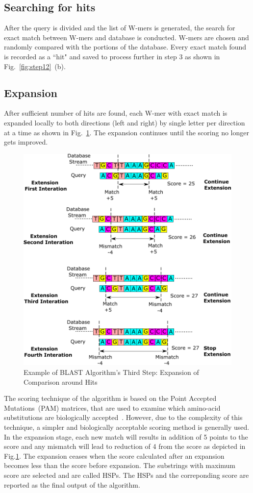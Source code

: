\subsection{Searching for hits}
After the query is divided and the list of W-mers is generated, the search for exact match between W-mers and database is conducted.
W-mers are chosen and randomly compared with the portions of the database. 
Every exact match found is recorded as a ``hit" and saved to process further in step 3 as shown in Fig.~\ref{fig:step12}~(b). 


\subsection{Expansion}
After sufficient number of hits are found, each W-mer with exact match is expanded locally to both directions (left and right) by single letter per direction at a time as shown in Fig.~\ref{fig:step3}. 
The expansion continues until the scoring no longer gets improved.
\begin{figure}[t!]
\centering
\includegraphics[width=\columnwidth]{Figures/Algorithm3.pdf}
\caption{Example of BLAST Algorithm's Third Step: Expansion of Comparison around Hits} 
\label{fig:step3}
\end{figure}
The scoring technique of the algorithm is based on the Point Accepted Mutations~(PAM) matrices, that are used to examine which amino-acid substitutions are biologically accepted~\cite{sotiriades2007design}. 
However, due to the complexity of this technique, a simpler and biologically acceptable scoring method is generally used. 
In the expansion stage, each new match will results in addition of 5 points to the score and any mismatch will lead to reduction of 4 from the score as depicted in Fig.\ref{fig:step3}.
The expansion ceases when the score calculated after an expansion becomes less than the score before expansion.
The substrings with maximum score are selected and are called HSPs.
The HSPs and the correponding score are reported as the final output of the algorithm.

